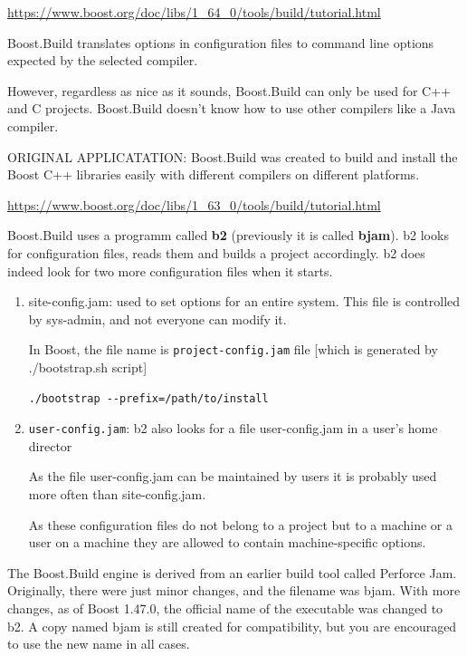 \url{https://www.boost.org/doc/libs/1_64_0/tools/build/tutorial.html}

Boost.Build translates options in configuration files to command line options
expected by the selected compiler.

However, regardless as nice as it sounds, Boost.Build can only be used for C++ and C projects.
Boost.Build doesn't know how to use other compilers like a Java compiler. 


ORIGINAL APPLICATATION:
Boost.Build was created to build and install the Boost C++ libraries easily with
different compilers on different platforms.

\url{https://www.boost.org/doc/libs/1_63_0/tools/build/tutorial.html}

Boost.Build uses a programm called {\bf b2} (previously it is called {\bf
bjam}). b2 looks for configuration files, reads them and builds a project
accordingly. b2 does indeed look for two more configuration files when it
starts.
\begin{enumerate}
  
  \item site-config.jam: used to set options for an entire system. This file is
  controlled by sys-admin, and not everyone can modify it.
  
In Boost, the file name is \verb!project-config.jam! file [which is generated by ./bootstrap.sh script]
\begin{verbatim}
./bootstrap --prefix=/path/to/install
\end{verbatim}

  \item \verb!user-config.jam!: b2 also looks for a file user-config.jam in a user's home director
  
As the file user-config.jam can be maintained by users it is probably used more
often than site-config.jam.
 
As these configuration files do not belong to a project but to a machine or a
user on a machine they are allowed to contain machine-specific options.

\end{enumerate}


\begin{mdframed}


The Boost.Build engine is derived from an earlier build tool called Perforce
Jam.
Originally, there were just minor changes, and the filename was bjam.
With more changes, as of Boost 1.47.0, the official name of the executable was
changed to b2. A copy named bjam is still created for compatibility, but you are
encouraged to use the new name in all cases.

\end{mdframed}


